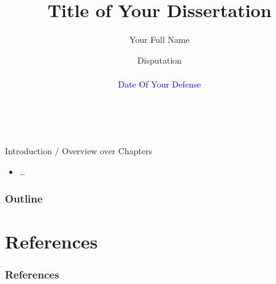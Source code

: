 \documentclass[aspectratio=169, 11pt, t]{beamer}
\title{Title of Your Dissertation}
\author[Your Last Name]{%
	Your Full Name \\%
}
\date{%
	Disputation \\[\medskipamount]
	\normalfont{Bonn Graduate School of Economics} \\[\medskipamount]
	\textcolor{blue}{Date Of Your Defense} %
}
\begin{document}

\begin{frame}{~}
	\titlepage
\end{frame}


\begin{frame}{Introduction / Overview over Chapters}
	\begin{itemize}
		\item \ldots
	\end{itemize}
\end{frame}

\begin{frame}[c]\frametitle{Outline}
     \tableofcontents[hideallsubsections]
 \end{frame} 









{

}

\section*{References}

\begin{frame}\frametitle{References}
	\printbibliography
\end{frame}
 

\backupbegin
   
\backupend
\end{document}
